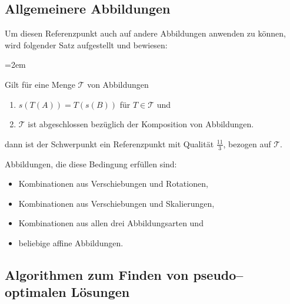 \subsection{Allgemeinere Abbildungen}

Um diesen Referenzpunkt auch auf andere Abbildungen anwenden zu können, wird folgender Satz aufgestellt und bewiesen:

\par
\begingroup
\leftskip=2em 

Gilt für eine Menge $\mathcal{T}$  von Abbildungen 
\begin{enumerate}
\item $s(T(A))=T(s(B))$ für $T\in\mathcal{T}$ und 
\item $\mathcal{T}$ ist abgeschlossen bezüglich der Komposition von Abbildungen.
\end{enumerate}
dann ist der Schwerpunkt ein  Referenzpunkt mit Qualität $\frac{11}{3}$, bezogen auf $\mathcal{T}$.
\par
\endgroup
Abbildungen, die diese Bedingung erfüllen sind: 
\begin{itemize}
\item Kombinationen aus Verschiebungen und Rotationen,
\item Kombinationen aus Verschiebungen und Skalierungen,
\item Kombinationen aus allen drei Abbildungsarten und
\item beliebige affine Abbildungen.
\end{itemize}

\subsection{Algorithmen zum Finden von pseudo--optimalen Lösungen}

